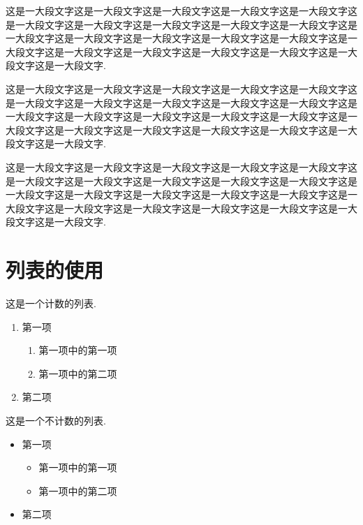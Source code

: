 \documentclass[a4paper,12pt]{article}
\begin{document}
这是一大段文字这是一大段文字这是一大段文字这是一大段文字这是一大段文字这是一大段文字这是一大段文字这是一大段文字这是一大段文字这是一大段文字这是一大段文字这是一大段文字这是一大段文字这是一大段文字这是一大段文字这是一大段文字这是一大段文字这是一大段文字这是一大段文字这是一大段文字这是一大段文字这是一大段文字.

这是一大段文字这是一大段文字这是一大段文字这是一大段文字这是一大段文字这是一大段文字这是一大段文字这是一大段文字这是一大段文字这是一大段文字这是一大段文字这是一大段文字这是一大段文字这是一大段文字这是一大段文字这是一大段文字这是一大段文字这是一大段文字这是一大段文字这是一大段文字这是一大段文字这是一大段文字.

这是一大段文字这是一大段文字这是一大段文字这是一大段文字这是一大段文字这是一大段文字这是一大段文字这是一大段文字这是一大段文字这是一大段文字这是一大段文字这是一大段文字这是一大段文字这是一大段文字这是一大段文字这是一大段文字这是一大段文字这是一大段文字这是一大段文字这是一大段文字这是一大段文字这是一大段文字.


\section{列表的使用}

这是一个计数的列表.
\begin{enumerate}%
	\item 第一项
		\begin{enumerate}
			\item 第一项中的第一项
			\item 第一项中的第二项
		\end{enumerate}
	\item 第二项
\end{enumerate}


这是一个不计数的列表.
\begin{itemize}%
	\item 第一项
	\begin{itemize}
		\item 第一项中的第一项
		\item 第一项中的第二项
	\end{itemize}
	\item 第二项
\end{itemize}





{} %
\end{document}
